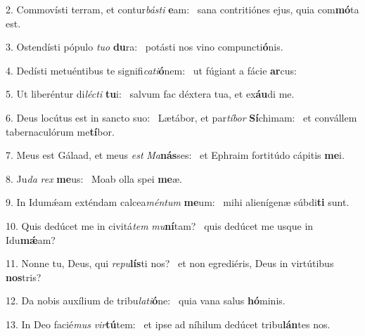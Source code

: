 2. Commovísti terram, et contur\textit{bás}\textit{ti} \textbf{e}am: \ast\  sana contritiónes ejus, quia com\textbf{mó}ta est.\

3. Ostendísti pópulo \textit{tu}\textit{o} \textbf{du}ra: \ast\  potásti nos vino compuncti\textbf{ó}nis.\

4. Dedísti metuéntibus te signifi\textit{ca}\textit{ti}\textbf{ó}nem: \ast\  ut fúgiant a fácie \textbf{ar}cus:\

5. Ut liberéntur di\textit{léc}\textit{ti} \textbf{tu}i: \ast\  salvum fac déxtera tua, et ex\textbf{áu}di me.\

6. Deus locútus est in sancto suo: \dag\  Lætábor, et par\textit{tí}\textit{bor} \textbf{Sí}chimam: \ast\  et convállem tabernaculórum me\textbf{tí}bor.\

7. Meus est Gálaad, et meus \textit{est} \textit{Ma}\textbf{nás}ses: \ast\  et Ephraim fortitúdo cápitis \textbf{me}i.\

8. Ju\textit{da} \textit{rex} \textbf{me}us: \ast\  Moab olla spei \textbf{me}æ.\

9. In Idumǽam exténdam calcea\textit{mén}\textit{tum} \textbf{me}um: \ast\  mihi alienígenæ súbdi\textbf{ti} sunt.\

10. Quis dedúcet me in civitá\textit{tem} \textit{mu}\textbf{ní}tam? \ast\  quis dedúcet me usque in Idu\textbf{mǽ}am?\

11. Nonne tu, Deus, qui \textit{re}\textit{pu}\textbf{lís}ti nos? \ast\  et non egrediéris, Deus in virtútibus \textbf{nos}tris?\

12. Da nobis auxílium de tribu\textit{la}\textit{ti}\textbf{ó}ne: \ast\  quia vana salus \textbf{hó}minis.\

13. In Deo facié\textit{mus} \textit{vir}\textbf{tú}tem: \ast\  et ipse ad níhilum dedúcet tribu\textbf{lán}tes nos.\

